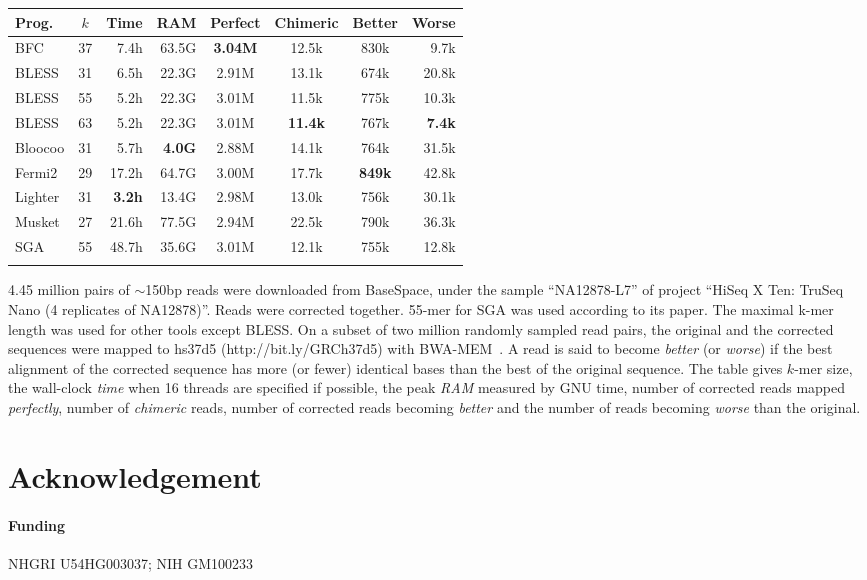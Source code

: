 \documentclass{bioinfo}
\begin{document}
\begin{table}[ht]
{\footnotesize
\begin{tabular}{lcrrcccr}
\toprule
Prog.     & $k$ & Time & RAM   & Perfect & Chimeric & Better & Worse \\
\midrule
BFC       & 37    & 7.4h & 63.5G &{\bf 3.04M}& 12.5k  & 830k   & 9.7k \\
BLESS     & 31    & 6.5h & 22.3G & 2.91M   & 13.1k    & 674k   & 20.8k \\
BLESS     & 55    & 5.2h & 22.3G & 3.01M   & 11.5k    & 775k   & 10.3k \\
BLESS     & 63    & 5.2h & 22.3G & 3.01M  &{\bf 11.4k}& 767k   &{\bf 7.4k} \\
Bloocoo   & 31    &5.7h&{\bf 4.0G}& 2.88M  & 14.1k    & 764k   & 31.5k  \\
Fermi2    & 29    &17.2h & 64.7G & 3.00M   & 17.7k    &{\bf 849k}&42.8k \\
Lighter   & 31    &{\bf 3.2h}& 13.4G&2.98M & 13.0k    & 756k   & 30.1k  \\
Musket    & 27    &21.6h & 77.5G & 2.94M   & 22.5k    & 790k   & 36.3k  \\
SGA       & 55    &48.7h & 35.6G & 3.01M   & 12.1k    & 755k   & 12.8k  \\
\botrule
\end{tabular}}{4.45 million pairs of $\sim$150bp reads were
downloaded from BaseSpace, under the sample ``NA12878-L7'' of project
``HiSeq X Ten: TruSeq Nano (4 replicates of NA12878)''. Reads were corrected
together. 55-mer for SGA was used according to its paper. The maximal k-mer
length was used for other tools except BLESS. On a subset of two million
randomly sampled read pairs, the original and the corrected sequences were
mapped to hs37d5 (http://bit.ly/GRCh37d5) with BWA-MEM~\citep{Li:2013aa}. A
read is said to become \emph{better} (or \emph{worse}) if the best alignment of
the corrected sequence has more (or fewer) identical bases than the best of the
original sequence. The table gives $k$-mer size, the wall-clock \emph{time} when 16 threads
are specified if possible, the peak \emph{RAM} measured by GNU time, number of
corrected reads mapped \emph{perfectly}, number of \emph{chimeric} reads,
number of corrected reads becoming \emph{better} and the number of reads
becoming \emph{worse} than the original.}

\end{table}

\section*{Acknowledgement}
\paragraph{Funding\textcolon} NHGRI U54HG003037; NIH GM100233


\end{document}
